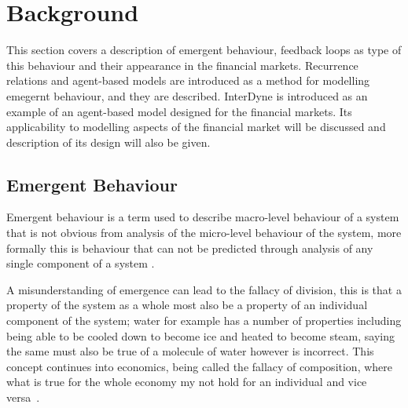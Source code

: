 \documentclass{article}
\begin{document}


\section{Background}
This section covers a description of emergent behaviour, feedback loops as type of this behaviour and their appearance in the financial markets. Recurrence relations and agent-based models are introduced as a method for modelling emegernt behaviour, and they are described. InterDyne is introduced as an example of an agent-based model designed for the financial markets. Its applicability to modelling aspects of the financial market will be discussed and description of its design will also be given.   

\subsection{Emergent Behaviour}
Emergent behaviour is a term used to describe macro-level behaviour of a system that is not obvious from analysis of the micro-level behaviour of the system, more formally this is behaviour that can not be predicted through analysis of any single component of a system \cite{EB_systemofsystemsGLangford}.

A misunderstanding of emergence can lead to the fallacy of division, this is that a property of the system as a whole most also be a property of an individual component of the system; water for example has a number of properties including being able to be cooled down to become ice and heated to become steam, saying the same must also be true of a molecule of water however is incorrect. This concept continues into economics, being called the fallacy of composition, where what is true for the whole economy my not hold for an individual and vice versa~\cite{fallacyofcompostionBook}.
       
\end{document}
